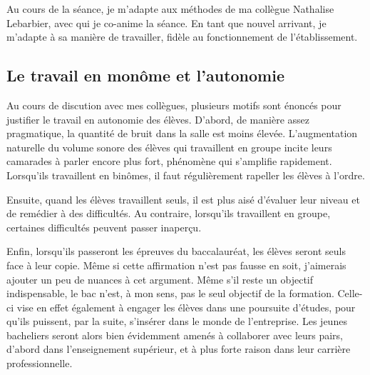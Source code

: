 \documentclass[pdftex,a4paper,12pt]{article}
\begin{document}
	Au cours de la séance, je m'adapte aux méthodes de ma collègue Nathalise Lebarbier, avec qui je co-anime la séance.
	En tant que nouvel arrivant, je m'adapte à sa manière de travailler, fidèle au fonctionnement de l'établissement.

	\subsection{Le travail en monôme et l'autonomie}

	Au cours de discution avec mes collègues, plusieurs motifs sont énoncés pour justifier le travail en autonomie des élèves.
	D'abord, de manière assez pragmatique, la quantité de bruit dans la salle est moins élevée. 
	L'augmentation naturelle du volume sonore des élèves qui travaillent en groupe incite leurs camarades à parler encore plus fort, phénomène qui s'amplifie rapidement. 
	Lorsqu'ils travaillent en binômes, il faut régulièrement rapeller les élèves à l'ordre.

	Ensuite, quand les élèves travaillent seuls, il est plus aisé d'évaluer leur niveau et de remédier à des difficultés. 
	Au contraire, lorsqu'ils travaillent en groupe, certaines difficultés peuvent passer inaperçu.

	Enfin, lorsqu'ils passeront les épreuves du baccalauréat, les élèves seront seuls face à leur copie.
	Même si cette affirmation n'est pas fausse en soit, j'aimerais ajouter un peu de nuances à cet argument.
	Même s'il reste un objectif indispensable, le bac n'est, à mon sens, pas le seul objectif de la formation.
	Celle-ci vise en effet également à engager les élèves dans une poursuite d'études, pour qu'ils puissent, par la suite, s'insérer dans le monde de l'entreprise.
	Les jeunes bacheliers seront alors bien évidemment amenés à collaborer avec leurs pairs, 
	d'abord dans l'enseignement supérieur, et à plus forte raison dans leur carrière professionnelle.\\
\end{document}
